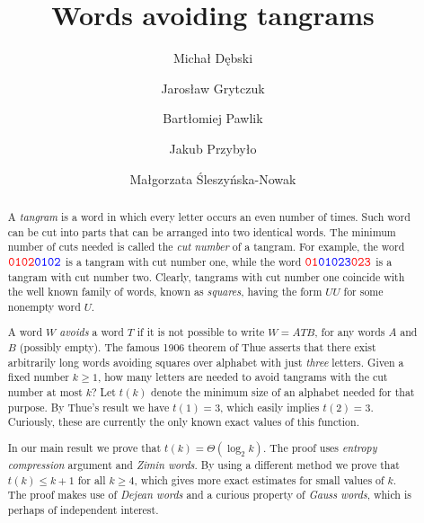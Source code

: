 \documentclass[12pt]{amsart}
\theoremstyle{plain}
\numberwithin{equation}{section}
\begin{document}
	\title{Words avoiding tangrams}
	
		\author[M. D\k ebski]{Micha{\l} D\k ebski}
	\address{Faculty of Mathematics and Information Science, Warsaw University
		of Technology, 00-662 Warsaw, Poland}
	
	\author[J. Grytczuk]{Jaros\l aw Grytczuk}
	\address{Faculty of Mathematics and Information Science, Warsaw University
		of Technology, 00-662 Warsaw, Poland}
	
	\author[B. Pawlik]{Bart\l omiej Pawlik}
	\address{Institute of Mathematics, Silesian University of Technology, 44-100 Gliwice, Poland}
	
	\author[J. Przyby\l o]{Jakub Przyby\l o}
	\address{AGH University of Krakow, al. A. Mickiewicza 30, 30-059 Krakow, Poland}
	
	\author[M. \'{S}leszy\'{n}ska-Nowak]{Ma\l gorzata \'{S}leszy\'{n}ska-Nowak}
	\address{Faculty of Mathematics and Information Science, Warsaw University
		of Technology, 00-662 Warsaw, Poland}
	

\begin{abstract}
	A \emph{tangram} is a word in which every letter occurs an even number of times. Such word can be cut into parts that can be arranged into two identical words. The minimum number of cuts needed is called the \emph{cut number} of a tangram. For example, the word $\mathtt{\color{red}{0102}\color{blue}{0102}}$ is a tangram with cut number one, while the word $\mathtt{\color{red}{01}\color{blue}{01023}\color{red}{023}}$ is a tangram with cut number two. Clearly, tangrams with cut number one coincide with the well known family of words, known as \emph{squares}, having the form $UU$ for some nonempty word $U$.
	
	A word $W$ \emph{avoids} a word $T$ if it is not possible to write $W=ATB$, for any words $A$ and $B$ (possibly empty). The famous 1906 theorem of Thue asserts that there exist arbitrarily long words avoiding squares over alphabet with just \emph{three} letters. Given a fixed number $k\geqslant 1$, how many letters are needed to avoid tangrams with the cut number at most $k$? Let $t(k)$ denote the minimum size of an alphabet needed for that purpose. By Thue's result we have $t(1)=3$, which easily implies $t(2)=3$. Curiously, these are currently the only known exact values of this function.
	
	In our main result we prove that $t(k)=\Theta(\log_2k)$. The proof uses \emph{entropy compression} argument and \emph{Zimin words}. By using a different method we prove that $t(k)\leqslant k+1$ for all $k\geqslant 4$, which gives more exact estimates for small values of $k$. The proof makes use of \emph{Dejean words} and a curious property of \emph{Gauss words}, which is perhaps of independent interest.

	\end{abstract}
	
\end{document}
